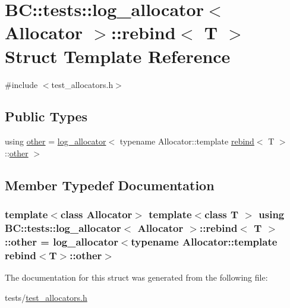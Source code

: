 \hypertarget{structBC_1_1tests_1_1log__allocator_1_1rebind}{}\section{BC\+:\+:tests\+:\+:log\+\_\+allocator$<$ Allocator $>$\+:\+:rebind$<$ T $>$ Struct Template Reference}
\label{structBC_1_1tests_1_1log__allocator_1_1rebind}


{\ttfamily \#include $<$test\+\_\+allocators.\+h$>$}

\subsection*{Public Types}
\begin{DoxyCompactItemize}
\item 
using \hyperlink{structBC_1_1tests_1_1log__allocator_1_1rebind_afdb3bbbf31e04da2b5ff719def1088bc}{other} = \hyperlink{structBC_1_1tests_1_1log__allocator}{log\+\_\+allocator}$<$ typename Allocator\+::template \hyperlink{structBC_1_1tests_1_1log__allocator_1_1rebind}{rebind}$<$ T $>$\+::\hyperlink{structBC_1_1tests_1_1log__allocator_1_1rebind_afdb3bbbf31e04da2b5ff719def1088bc}{other} $>$
\end{DoxyCompactItemize}


\subsection{Member Typedef Documentation}
\subsubsection[{\texorpdfstring{other}{other}}]{\setlength{\rightskip}{0pt plus 5cm}template$<$class Allocator$>$ template$<$class T $>$ using {\bf B\+C\+::tests\+::log\+\_\+allocator}$<$ {\bf Allocator} $>$\+::{\bf rebind}$<$ T $>$\+::{\bf other} =  {\bf log\+\_\+allocator}$<$typename Allocator\+::template {\bf rebind}$<$T$>$\+::{\bf other}$>$}\hypertarget{structBC_1_1tests_1_1log__allocator_1_1rebind_afdb3bbbf31e04da2b5ff719def1088bc}{}\label{structBC_1_1tests_1_1log__allocator_1_1rebind_afdb3bbbf31e04da2b5ff719def1088bc}


The documentation for this struct was generated from the following file\+:\begin{DoxyCompactItemize}
\item 
tests/\hyperlink{test__allocators_8h}{test\+\_\+allocators.\+h}\end{DoxyCompactItemize}
